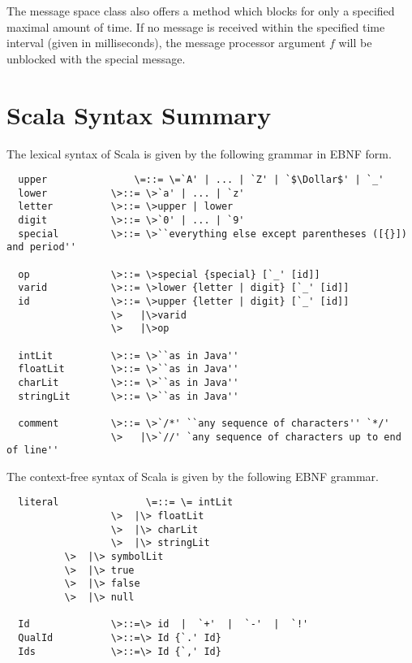 \documentclass[11pt]{report}
\begin{document}
The message space class also offers a method \verb@receiveWithin@
which blocks for only a specified maximal amount of time.  If no
message is received within the specified time interval (given in
milliseconds), the message processor argument $f$ will be unblocked
with the special \verb@TIMEOUT@ message.

\appendix
\chapter{Scala Syntax Summary}

The lexical syntax of Scala is given by the following grammar in EBNF
form.

\begin{verbatim}
  upper               \=::= \=`A' | ... | `Z' | `$\Dollar$' | `_'
  lower           \>::= \>`a' | ... | `z'
  letter          \>::= \>upper | lower
  digit           \>::= \>`0' | ... | `9'
  special         \>::= \>``everything else except parentheses ([{}]) and period''

  op              \>::= \>special {special} [`_' [id]]
  varid           \>::= \>lower {letter | digit} [`_' [id]]
  id              \>::= \>upper {letter | digit} [`_' [id]]
                  \>   |\>varid
                  \>   |\>op

  intLit          \>::= \>``as in Java''
  floatLit        \>::= \>``as in Java''
  charLit         \>::= \>``as in Java''
  stringLit       \>::= \>``as in Java''

  comment         \>::= \>`/*' ``any sequence of characters'' `*/'
                  \>   |\>`//' `any sequence of characters up to end of line''
\end{verbatim}

The context-free syntax of Scala is given by the following EBNF
grammar.

\begin{verbatim}
  literal               \=::= \= intLit
                  \>  |\> floatLit
                  \>  |\> charLit
                  \>  |\> stringLit
		  \>  |\> symbolLit
		  \>  |\> true
		  \>  |\> false
		  \>  |\> null

  Id              \>::=\> id  |  `+'  |  `-'  |  `!'
  QualId          \>::=\> Id {`.' Id}
  Ids             \>::=\> Id {`,' Id}
\end{verbatim}
\end{document}
